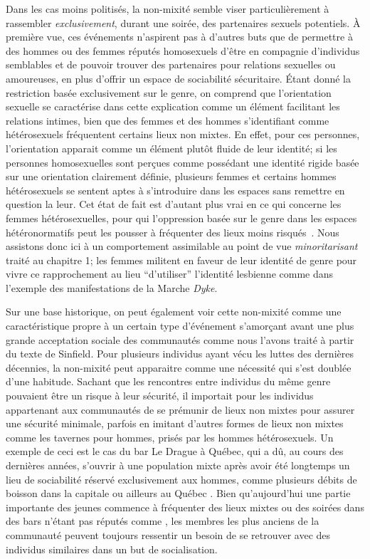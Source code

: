 Dans les cas moins politisés, la non-mixité semble viser particulièrement à rassembler \emph{exclusivement}, durant une soirée, des partenaires sexuels potentiels.
À première vue, ces événements n'aspirent pas à d'autres buts que de permettre à des hommes ou des femmes réputés homosexuels d'être en compagnie d'individus semblables et de pouvoir trouver des partenaires pour relations sexuelles ou amoureuses, en plus d'offrir un espace de sociabilité sécuritaire.
Étant donné la restriction basée exclusivement sur le genre, on comprend que l'orientation sexuelle se caractérise dans cette explication comme un élément facilitant les relations intimes, bien que des femmes et des hommes s'identifiant comme hétérosexuels fréquentent certains lieux non mixtes.
En effet, pour ces personnes, l'orientation apparait comme un élément plutôt fluide de leur identité; si les personnes homosexuelles sont perçues comme possédant une identité rigide basée sur une orientation clairement définie, plusieurs femmes et certains hommes hétérosexuels se sentent aptes à s'introduire dans les espaces \lgbt{} sans remettre en question la leur.
Cet état de fait est d'autant plus vrai en ce qui concerne les femmes hétérosexuelles, pour qui l'oppression basée sur le genre dans les espaces hétéronormatifs peut les pousser à fréquenter \lgbt{} des lieux moins risqués~\citep[][9]{Bettani2014}.
Nous assistons donc ici à un comportement assimilable au point de vue \emph{minoritarisant} traité au chapitre 1; les femmes militent en faveur de leur identité de genre pour vivre ce rapprochement au lieu \enquote{d'utiliser} l'identité lesbienne comme dans l'exemple des manifestations de la Marche \emph{Dyke}.

Sur une base historique, on peut également voir cette non-mixité comme une caractéristique propre à un certain type d'événement s'amorçant avant une plus grande acceptation sociale des communautés \lgbt{} comme nous l'avons traité à partir du texte de Sinfield.
Pour plusieurs individus \lgbt{} ayant vécu les luttes \lgbt{} des dernières décennies, la non-mixité peut apparaitre comme une nécessité qui s'est doublée d'une habitude.
Sachant que les rencontres entre individus du même genre pouvaient être un risque à leur sécurité, il importait pour les individus appartenant aux  communautés \lgbt{} de se prémunir de lieux non mixtes pour assurer une sécurité minimale, parfois en imitant d'autres formes de lieux non mixtes comme les tavernes pour hommes, prisés par les hommes hétérosexuels.
Un exemple de ceci est le cas du bar Le Drague à Québec, qui a dû, au cours des dernières années, s'ouvrir à une population mixte après avoir été longtemps un lieu de sociabilité réservé exclusivement aux hommes, comme plusieurs débits de boisson dans la capitale ou ailleurs au Québec \missref{}.
Bien qu'aujourd'hui une partie importante des jeunes \lgbt{} commence à fréquenter des lieux mixtes ou des soirées dans des bars n'étant pas réputés comme \lgbt{}, les membres les plus anciens de la communauté peuvent toujours ressentir un besoin de se retrouver avec des individus similaires dans un but de socialisation.

